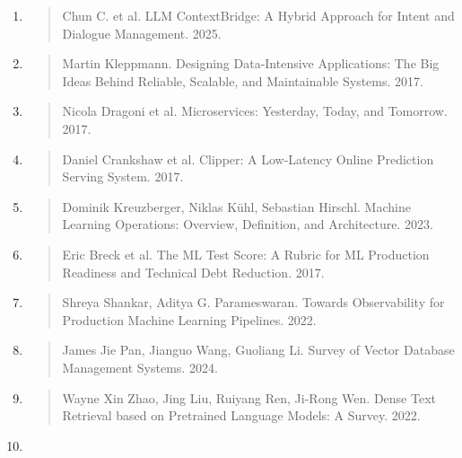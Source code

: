\begin{enumerate}
\begin{quote}
  Zangari A. et al. Ticket Automation: An Insight into Current Research
  with Applications to Multi-level Classification Scenarios. 2023.
  \end{quote}
\item
  \begin{quote}
  Chun C. et al. LLM ContextBridge: A Hybrid Approach for Intent and
  Dialogue Management. 2025.
  \end{quote}
\item
  \begin{quote}
  Martin Kleppmann. Designing Data-Intensive Applications: The Big Ideas
  Behind Reliable, Scalable, and Maintainable Systems. 2017.
  \end{quote}
\item
  \begin{quote}
  Nicola Dragoni et al. Microservices: Yesterday, Today, and Tomorrow.
  2017.
  \end{quote}
\item
  \begin{quote}
  Daniel Crankshaw et al. Clipper: A Low-Latency Online Prediction
  Serving System. 2017.
  \end{quote}
\item
  \begin{quote}
  Dominik Kreuzberger, Niklas Kühl, Sebastian Hirschl. Machine Learning
  Operations: Overview, Definition, and Architecture. 2023.
  \end{quote}
\item
  \begin{quote}
  Eric Breck et al. The ML Test Score: A Rubric for ML Production
  Readiness and Technical Debt Reduction. 2017.
  \end{quote}
\item
  \begin{quote}
  Shreya Shankar, Aditya G. Parameswaran. Towards Observability for
  Production Machine Learning Pipelines. 2022.
  \end{quote}
\item
  \begin{quote}
  James Jie Pan, Jianguo Wang, Guoliang Li. Survey of Vector Database
  Management Systems. 2024.
  \end{quote}
\item
  \begin{quote}
  Wayne Xin Zhao, Jing Liu, Ruiyang Ren, Ji-Rong Wen. Dense Text
  Retrieval based on Pretrained Language Models: A Survey. 2022.
  \end{quote}
\item

\end{enumerate}
